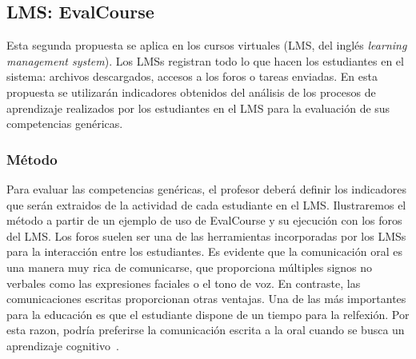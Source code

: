 


\subsection{LMS: EvalCourse}

Esta segunda propuesta se aplica en los cursos virtuales (LMS, del inglés \emph{learning management system}). Los LMSs registran todo lo que hacen los estudiantes en el sistema: archivos descargados, accesos a los foros o tareas enviadas. En esta propuesta se utilizarán indicadores obtenidos del análisis de los procesos de aprendizaje realizados por los estudiantes en el LMS para la evaluación de sus competencias genéricas.

\subsubsection{Método}

Para evaluar las competencias genéricas, el profesor deberá definir los indicadores que serán extraidos de la actividad de cada estudiante en el LMS. Ilustraremos el método a partir de un ejemplo de uso de EvalCourse y su ejecución con los foros del LMS. Los foros suelen ser una de las herramientas incorporadas por los LMSs para la interacción entre los estudiantes. Es evidente que la comunicación oral es una manera muy rica de comunicarse, que proporciona múltiples signos no verbales como las expresiones faciales o el tono de voz. En contraste, las comunicaciones escritas proporcionan otras ventajas. Una de las más importantes para la educación es que el estudiante dispone de un tiempo para la relfexión. Por esta razon, podría preferirse la comunicación escrita a la oral cuando se busca un aprendizaje cognitivo~\cite{garrison1999critical}.

